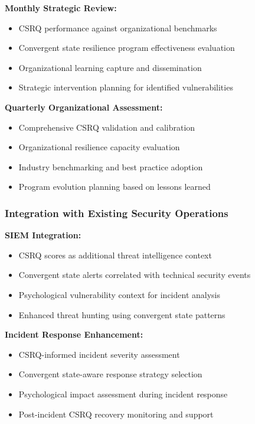 \documentclass[11pt,a4paper]{article}
\begin{document}
\textbf{Monthly Strategic Review:}
\begin{itemize}
\item CSRQ performance against organizational benchmarks
\item Convergent state resilience program effectiveness evaluation
\item Organizational learning capture and dissemination
\item Strategic intervention planning for identified vulnerabilities
\end{itemize}

\textbf{Quarterly Organizational Assessment:}
\begin{itemize}
\item Comprehensive CSRQ validation and calibration
\item Organizational resilience capacity evaluation
\item Industry benchmarking and best practice adoption
\item Program evolution planning based on lessons learned
\end{itemize}

\subsubsection{Integration with Existing Security Operations}

\textbf{SIEM Integration:}
\begin{itemize}
\item CSRQ scores as additional threat intelligence context
\item Convergent state alerts correlated with technical security events
\item Psychological vulnerability context for incident analysis
\item Enhanced threat hunting using convergent state patterns
\end{itemize}

\textbf{Incident Response Enhancement:}
\begin{itemize}
\item CSRQ-informed incident severity assessment
\item Convergent state-aware response strategy selection
\item Psychological impact assessment during incident response
\item Post-incident CSRQ recovery monitoring and support
\end{itemize}
\end{document}
